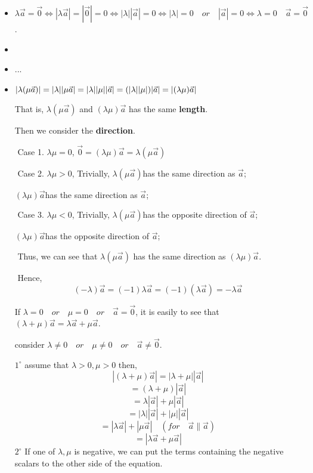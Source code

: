 \documentclass[11pt]{book}
\begin{document}
\begin{itemize}



\item $\lambda \vec a  = \vec  0  \iff |\lambda \vec a | = |\vec 0 | =0 \iff |\lambda||\vec  a|=0 \iff |\lambda |=0 \quad or \quad |\vec a|=0\iff \lambda =0 \quad \vec  a = \vec 0 $.
\item 
\item  ...
\item $|\lambda (\mu \vec a )|= |\lambda ||\mu \vec  a |\\= |\lambda||\mu||\vec  a |\\= (|\lambda ||\mu|)|\vec a|\\= |(\lambda \mu)\vec a|$

That is, $\lambda (\mu \vec  a )$ and $(\lambda \mu )\vec a$ has the same \textbf{length}.

Then we consider the \textbf{direction}.

​	Case 1. $\lambda \mu=0$, $ \vec 0 =(\lambda \mu )\vec  a= \lambda (\mu \vec a )$

​	Case 2. $\lambda \mu >0$, Trivially, $\lambda (\mu \vec  a )$has the same direction as $\vec  a $;

​												$(\lambda \mu) \vec  a$has the same direction as $\vec  a$;											

​	Case 3. $\lambda \mu <0$, Trivially, $\lambda (\mu \vec  a )$has the opposite direction of $\vec  a $;

​												$(\lambda \mu) \vec  a$has the opposite direction of $\vec  a $;			

​	Thus, we can see that $\lambda (\mu \vec  a )$ has the same direction as $(\lambda \mu) \vec  a $.

​	Hence, 
$$
(- \lambda )\vec a  =  (-1)\lambda \vec a  = (-1)(\lambda \vec a)= -\lambda \vec a 
$$

If $\lambda =0 \quad or\quad  \mu =0 \quad or \quad \vec a =\vec 0 $, it is easily to see that $(\lambda + \mu )\vec  a = \lambda \vec a  + \mu \vec a$.

consider $\lambda \neq 0 \quad or\quad  \mu \neq 0 \quad or \quad \vec a \neq \vec 0 $.

​	$1^{\circ}$  assume that $\lambda >0 , \mu >0 $ then,
$$
|(\lambda + \mu)\vec a |= |\lambda +\mu ||\vec a | 
$$
$$
= (\lambda +\mu )|\vec a | 
$$
$$
= \lambda |\vec a |+\mu |\vec a | 
$$
$$
= |\lambda||\vec a| + |\mu | |\vec  a |
$$
$$
= |\lambda \vec a | + |\mu \vec a |\quad (for \quad  \vec a \parallel \vec a) 
$$
$$
= |\lambda \vec a +\mu \vec a |
$$
​	$2^{\circ}$  If one of  $\lambda ,\mu $ is negative, we can put the terms containing the negative scalars to the other side of the equation.


\end{itemize}
\end{document}
